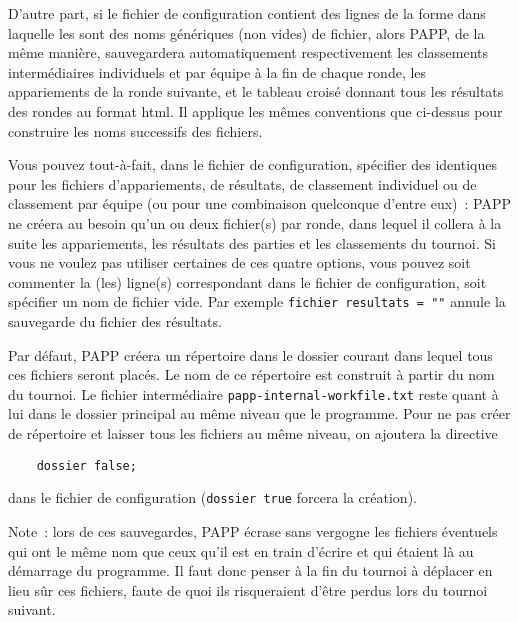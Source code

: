 \documentclass[10pt]{article}
\begin{document}
D'autre part, si le fichier de configuration contient des lignes de la
forme 
\medbreak
{}
\medbreak
\noindent dans laquelle les  sont des noms génériques (non 
vides) de fichier, alors PAPP, de la même manière, sauvegardera 
automatiquement respectivement les classements intermédiaires individuels et par 
équipe à la fin de chaque ronde, les appariements de la ronde 
suivante, et le tableau croisé donnant tous les résultats des rondes au format html.
Il applique les mêmes conventions que ci-dessus pour  construire les noms successifs des fichiers.

Vous pouvez tout-à-fait, dans le fichier de configuration, 
spécifier des  identiques pour les fichiers 
d'appariements, de résultats, de classement individuel ou de 
classement par équipe (ou pour une combinaison quelconque d'entre 
eux)~: PAPP ne créera au besoin qu'un ou deux fichier(s) par ronde, 
dans lequel il collera à la suite les appariements, les résultats 
des parties et les classements du tournoi.  Si vous ne voulez pas 
utiliser certaines de ces quatre options, vous pouvez soit commenter la 
(les) ligne(s) correspondant dans le fichier de configuration, soit 
spécifier un nom de fichier vide.  Par exemple 
\hbox{\verb|fichier resultats = ""|} annule la sauvegarde du fichier 
des résultats.

Par défaut, PAPP créera un répertoire dans le dossier courant dans lequel tous ces fichiers seront placés.
Le nom de ce répertoire est construit à partir du nom du tournoi. Le fichier intermédiaire \verb|papp-internal-workfile.txt| reste quant à lui dans le dossier principal au même niveau que le programme.
Pour ne pas créer de répertoire et laisser tous les fichiers au même niveau, on ajoutera la directive
\begin{verbatim}
    dossier false;
\end{verbatim}
dans le fichier de configuration (\verb|dossier true| forcera la création).
 
Note~: lors de ces sauvegardes, PAPP écrase sans vergogne les 
fichiers éventuels qui ont le même nom que ceux qu'il est en train 
d'écrire et qui étaient là au démarrage du programme.  Il faut 
donc penser à la fin du tournoi à déplacer en lieu s\^ur ces 
fichiers, faute de quoi ils risqueraient d'être perdus lors du 
tournoi suivant.
\end{document}
